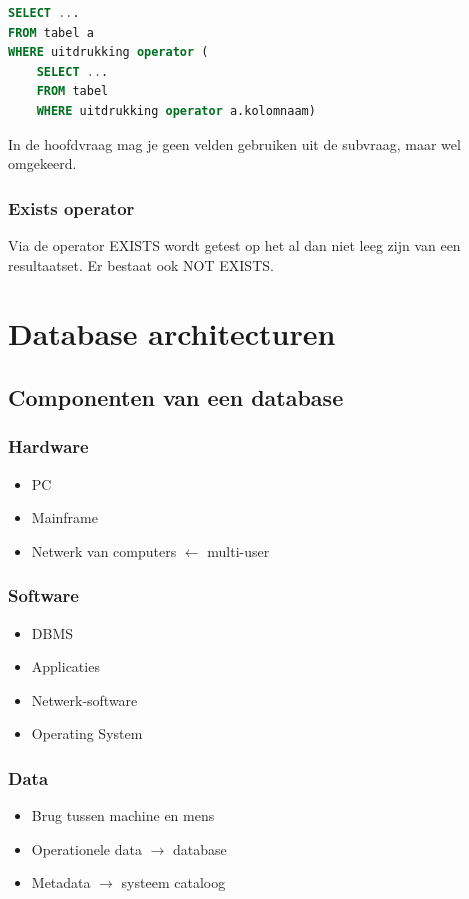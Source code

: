 \documentclass[a4paper,12pt]{article}
\begin{document}
\begin{lstlisting}[language=sql]
SELECT ...
FROM tabel a
WHERE uitdrukking operator (
	SELECT ...
	FROM tabel
	WHERE uitdrukking operator a.kolomnaam)
\end{lstlisting}
In de hoofdvraag mag je geen velden gebruiken uit de subvraag, maar wel omgekeerd.

\subsubsection{Exists operator}
Via de operator EXISTS wordt getest op het al dan niet leeg zijn van een resultaatset. Er bestaat ook NOT EXISTS.

\section{Database architecturen}
\subsection{Componenten van een database}
\subsubsection{Hardware}
\begin{itemize}
\item PC
\item Mainframe
\item Netwerk van computers $\leftarrow$ multi-user
\end{itemize}

\subsubsection{Software}
\begin{itemize}
\item DBMS
\item Applicaties
\item Netwerk-software
\item Operating System
\end{itemize}

\subsubsection{Data}
\begin{itemize}
\item Brug tussen machine en mens
\item Operationele data $\rightarrow$ database
\item Metadata $\rightarrow$ systeem cataloog
\end{itemize}
\end{document}
